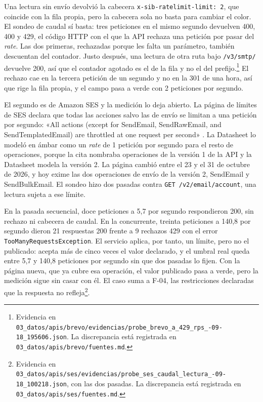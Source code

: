 Una lectura sin envío devolvió la cabecera \texttt{x-sib-\allowbreak ratelimit-\allowbreak limit:~2}, que coincide con la fila propia, pero la cabecera sola no basta para cambiar el color.
El sondeo de caudal sí basta: tres peticiones en el mismo segundo devuelven 400, 400 y 429, el código HTTP con el que la API rechaza una petición por pasar del \textit{rate}.
Las dos primeras, rechazadas porque les falta un parámetro, también descuentan del contador.
Justo después, una lectura de otra ruta bajo \texttt{/v3/smtp/} devuelve 200, así que el contador agotado es el de la fila y no el del prefijo.\footnote{Evidencia en \texttt{03\_datos/\allowbreak apis/\allowbreak brevo/\allowbreak evidencias/\allowbreak probe\_brevo\_a\_429\_rps\_-09-18\_195606.json}. La discrepancia está registrada en \texttt{03\_datos/\allowbreak apis/\allowbreak brevo/\allowbreak fuentes.md}.}
El rechazo cae en la tercera petición de un segundo y no en la 301 de una hora, así que rige la fila propia, y el campo pasa a verde con 2 peticiones por segundo.

El segundo es de Amazon SES y la medición lo deja abierto.
La página de límites de SES declara que todas las acciones salvo las de envío se limitan a una petición por segundo: «All actions (except for SendEmail, SendRawEmail, and SendTemplatedEmail) are throttled at one request per second» \citep{sesdocs}.
La Datasheet lo modeló en ámbar como un \textit{rate} de 1 petición por segundo para el resto de operaciones, porque la cita nombraba operaciones de la versión 1 de la API y la Datasheet modela la versión 2.
La página cambió entre el 23 y el 31 de octubre de 2026, y hoy exime las dos operaciones de envío de la versión 2, SendEmail y SendBulkEmail.
El sondeo hizo dos pasadas contra \texttt{GET /v2/email/account}, una lectura sujeta a ese límite.

En la pasada secuencial, doce peticiones a 5,7 por segundo respondieron 200, sin rechazo ni cabecera de caudal.
En la concurrente, treinta peticiones a 140,8 por segundo dieron 21 respuestas 200 frente a 9 rechazos 429 con el error \texttt{TooManyRequestsException}.
El servicio aplica, por tanto, un límite, pero no el publicado: acepta más de cinco veces el valor declarado, y el umbral real queda entre 5,7 y 140,8 peticiones por segundo sin que dos pasadas lo fijen.
Con la página nueva, que ya cubre esa operación, el valor publicado pasa a verde, pero la medición sigue sin casar con él.
El caso suma a F-04, las restricciones declaradas que la respuesta no refleja\footnote{Evidencia en \texttt{03\_datos/\allowbreak apis/\allowbreak ses/\allowbreak evidencias/\allowbreak probe\_ses\_caudal\_lectura\_-09-18\_100218.json}, con las dos pasadas. La discrepancia está registrada en \texttt{03\_datos/\allowbreak apis/\allowbreak ses/\allowbreak fuentes.md}.}.

